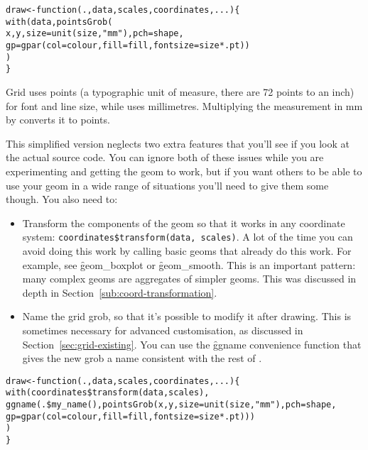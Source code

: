 % 
\begin{alltt}
draw <- function(., data, scales, coordinates, ...) \verb|{|    
  with(data, pointsGrob(
      x, y, size = unit(size, "mm"), pch = shape, 
      gp = gpar(col = colour, fill = fill, fontsize = size * .pt))
  )
\verb|}|\end{alltt}


Grid uses points (a typographic unit of measure, there are 72 points to an inch) for font and line size, while \ggplot uses millimetres.  Multiplying the   measurement in mm by  converts it to points.  

This simplified version neglects two extra features that you'll see if you look at the actual source code.  You can ignore both of these issues while you are experimenting and getting the geom to work, but if you want others to be able to use your geom in a wide range of situations you'll need to give them some though.  You also need to:

\begin{itemize}
  \item Transform the components of the geom so that it works in any coordinate system: \verb|coordinates$transform(data, scales)|.  A lot of the time you can avoid doing this work by calling basic geoms that already do this work.  For example, see \f{geom_boxplot} or \f{geom_smooth}.  This is an important pattern: many complex geoms are aggregates of simpler geoms.  This was discussed in depth in Section~\ref{sub:coord-transformation}.

  \item Name the grid grob, so that it's possible to modify it after drawing.  This is sometimes necessary for advanced customisation, as discussed in Section~\ref{sec:grid-existing}.  You can use the \f{ggname} convenience function that gives the new grob a name consistent with the rest of \ggplot.
\end{itemize}

% 
\begin{alltt}
draw <- function(., data, scales, coordinates, ...) \{    
  with(coordinates\$transform(data, scales), 
    ggname(.\$my\_name(), pointsGrob(x, y, size=unit(size, "mm"), pch=shape, 
    gp=gpar(col=colour, fill = fill, fontsize = size * .pt)))
  )
\}\end{alltt}

